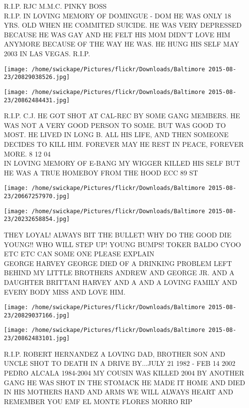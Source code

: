 \documentclass[10pt,letterpaper]{article}
\begin{document}
R.I.P. RJC M.M.C. PINKY BOSS\\
R.I.P. IN LOVING MEMORY OF DOMINGUE {-} DOM HE WAS ONLY 18 YRS. OLD WHEN HE COMMITED SUICIDE.  HE WAS VERY DEPRESSED BECAUSE HE WAS GAY AND HE FELT HIS MOM DIDN'T LOVE HIM ANYMORE BECAUSE OF THE WAY HE WAS.  HE HUNG HIS SELF MAY 2003 IN LAS VEGAS.  R.I.P.
\pagebreak

\texttt{[image: /home/swickape/Pictures/flickr/Downloads/Baltimore 2015-08-23/20829038526.jpg]}

\vspace{0.25in}
\texttt{[image: /home/swickape/Pictures/flickr/Downloads/Baltimore 2015-08-23/20862484431.jpg]}

R.I.P. C.J. HE GOT SHOT AT CAL{-}REC BY SOME GANG MEMBERS.  HE WAS NOT A VERY GOOD PERSON TO SOME.  BUT WAS GOOD TO MOST.  HE LIVED IN LONG B. ALL HIS LIFE, AND THEN SOMEONE DECIDES TO KILL HIM.  FOREVER MAY HE REST IN PEACE, FOREVER MORE.  8 12 04\\
IN LOVING MEMORY OF E{-}BANG MY WIGGER KILLED HIS SELF BUT HE WAS A TRUE HOMEBOY FROM THE HOOD ECC 89 ST
\pagebreak

\texttt{[image: /home/swickape/Pictures/flickr/Downloads/Baltimore 2015-08-23/20667257970.jpg]}

\vspace{0.25in}
\texttt{[image: /home/swickape/Pictures/flickr/Downloads/Baltimore 2015-08-23/20232658854.jpg]}

THEY LOYAL!  ALWAYS BIT THE BULLET!  WHY DO THE GOOD DIE YOUNG!! WHO WILL STEP UP!  YOUNG BUMPS! TOKER BALDO CYOO ETC ETC CAN SOME ONE PLEASE EXPLAIN\\
GEORGE HARVEY GEORGE DIED OF A DRINKING PROBLEM LEFT BEHIND MY LITTLE BROTHERS ANDREW AND GEORGE JR. AND A DAUGHTER BRITTANI HARVEY AND A AND A LOVING FAMILY AND EVERY BODY MISS AND LOVE HIM.
\pagebreak

\texttt{[image: /home/swickape/Pictures/flickr/Downloads/Baltimore 2015-08-23/20829037166.jpg]}

\vspace{0.25in}
\texttt{[image: /home/swickape/Pictures/flickr/Downloads/Baltimore 2015-08-23/20862483101.jpg]}

R.I.P. ROBERT HERNANDEZ A LOVING DAD, BROTHER SON AND UNCLE SHOT TO DEATH IN A DRIVE BY...JULY 21 1982 {-} FEB 14 2002\\
PEDRO ALCALA 1984{-}2004 MY COUSIN WAS KILLED 2004 BY ANOTHER GANG HE WAS SHOT IN THE STOMACK HE MADE IT HOME AND DIED IN HIS MOTHERS HAND AND ARMS WE WILL ALWAYS HEART AND REMEMBER YOU EMF EL MONTE FLORES MORRO RIP
\pagebreak
\end{document}
